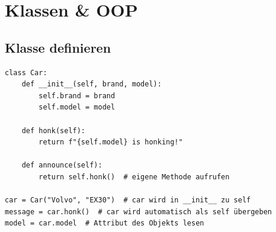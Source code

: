 \section{Klassen \& OOP}\label{sec:02-klassen}

\subsection{Klasse definieren}\label{sec:02-klasse-definieren}
\begin{codebox}
\begin{lstlisting}[style=CodeExpert]
class Car:
    def __init__(self, brand, model):
        self.brand = brand
        self.model = model

    def honk(self):
        return f"{self.model} is honking!"

    def announce(self):
        return self.honk()  # eigene Methode aufrufen

car = Car("Volvo", "EX30")  # car wird in __init__ zu self
message = car.honk()  # car wird automatisch als self übergeben
model = car.model  # Attribut des Objekts lesen
\end{lstlisting}
\end{codebox}

\begin{defbox}
\begin{factlist}
\end{factlist}
\end{defbox}

